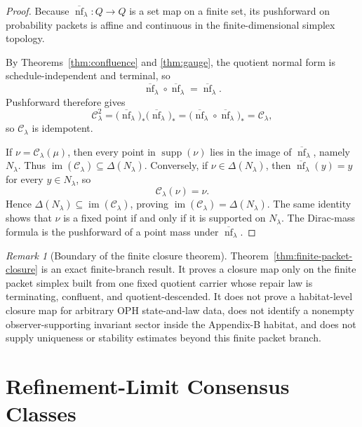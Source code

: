 \documentclass[11pt]{article}
\theoremstyle{remark}
\newtheorem{remark}[theorem]{Remark}
\theoremstyle{plain}
\begin{document}
\begin{proof}
Because \(\overline{\operatorname{nf}}_\lambda:Q\to Q\) is a set map on a finite set, its
pushforward on probability packets is affine and continuous in the finite-dimensional simplex
topology.

By Theorems~\ref{thm:confluence} and \ref{thm:gauge}, the quotient normal form is
schedule-independent and terminal, so
\[
\overline{\operatorname{nf}}_\lambda\circ\overline{\operatorname{nf}}_\lambda
=
\overline{\operatorname{nf}}_\lambda.
\]
Pushforward therefore gives
\[
\mathcal C_\lambda^2
=
\bigl(\overline{\operatorname{nf}}_\lambda\bigr)_*
\bigl(\overline{\operatorname{nf}}_\lambda\bigr)_*
=
\bigl(\overline{\operatorname{nf}}_\lambda\circ\overline{\operatorname{nf}}_\lambda\bigr)_*
=
\mathcal C_\lambda,
\]
so \(\mathcal C_\lambda\) is idempotent.

If \(\nu=\mathcal C_\lambda(\mu)\), then every point in \(\operatorname{supp}(\nu)\) lies in the
image of \(\overline{\operatorname{nf}}_\lambda\), namely \(N_\lambda\). Thus
\(\operatorname{im}(\mathcal C_\lambda)\subseteq \Delta(N_\lambda)\). Conversely, if
\(\nu\in\Delta(N_\lambda)\), then \(\overline{\operatorname{nf}}_\lambda(y)=y\) for every
\(y\in N_\lambda\), so
\[
\mathcal C_\lambda(\nu)=\nu.
\]
Hence \(\Delta(N_\lambda)\subseteq \operatorname{im}(\mathcal C_\lambda)\), proving
\(\operatorname{im}(\mathcal C_\lambda)=\Delta(N_\lambda)\). The same identity shows that
\(\nu\) is a fixed point if and only if it is supported on \(N_\lambda\). The Dirac-mass formula
is the pushforward of a point mass under \(\overline{\operatorname{nf}}_\lambda\).
\end{proof}

\begin{remark}[Boundary of the finite closure theorem]\label{rem:finite-packet-closure}
Theorem~\ref{thm:finite-packet-closure} is an exact finite-branch result. It proves a closure map
only on the finite packet simplex built from one fixed quotient carrier whose repair law is
terminating, confluent, and quotient-descended. It does not prove a habitat-level closure
map for arbitrary OPH state-and-law data, does not identify a nonempty observer-supporting
invariant sector inside the Appendix-B habitat, and does not supply uniqueness or stability
estimates beyond this finite packet branch.
\end{remark}


\section{Refinement-Limit Consensus Classes}
\label{sec:refinement-consensus}
\end{document}
